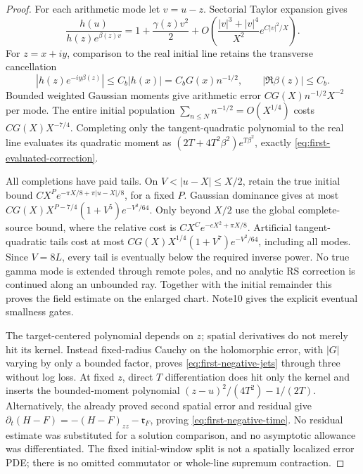 \documentclass[11pt]{article}
\numberwithin{equation}{section}
\begin{document}
\begin{proof}
For each arithmetic mode let \(v=u-z\). Sectorial Taylor expansion gives
\begin{equation}
 \frac{h(u)}{h(z)e^{\beta(z)v}}
 =1+\frac{\gamma(z)v^2}{2}
 +O\!\left(\frac{|v|^3+|v|^4}{X^2}e^{C|v|^2/X}\right).
 \label{eq:first-local-remainder}
\end{equation}
For \(z=x+iy\), comparison to the real initial line retains the
transverse cancellation
\[
 |h(z)e^{-iy\beta(z)}|\le C_b|h(x)|=C_bG(x)n^{-1/2},
 \qquad |\Re\beta(z)|\le C_b.
\]
Bounded weighted Gaussian moments give arithmetic error
\(CG(X)n^{-1/2}X^{-2}\) per mode. The entire initial population
\(\sum_{n\le N}n^{-1/2}=O(X^{1/4})\) costs
\(CG(X)X^{-7/4}\). Completing only the tangent-quadratic polynomial
to the real line evaluates its quadratic moment as
\((2T+4T^2\beta^2)e^{T\beta^2}\), exactly
\eqref{eq:first-evaluated-correction}.

All completions have paid tails. On
\(V<|u-X|\le X/2\), retain the true initial bound
\(CX^P e^{-\pi X/8+\pi|u-X|/8}\), for a fixed \(P\).
Gaussian dominance gives at most
\(CG(X)X^{P-7/4}(1+V^5)e^{-V^2/64}\).
Only beyond \(X/2\) use the global complete-source bound, where the
relative cost is \(CX^C e^{-cX^2+\pi X/8}\).
Artificial tangent-quadratic tails cost at most
\(CG(X)X^{1/4}(1+V^7)e^{-V^2/64}\), including all modes.
Since \(V=8L\), every tail is eventually below the required inverse
power. No true gamma mode is extended through remote poles, and no
analytic RS correction is continued along an unbounded ray.
Together with the initial remainder this proves the field estimate on
the enlarged chart. Note10 gives the explicit eventual smallness gates.

The target-centered polynomial depends on \(z\); spatial derivatives
do not merely hit its kernel. Instead fixed-radius Cauchy on the
holomorphic error, with \(|G|\) varying by only a bounded factor,
proves \eqref{eq:first-negative-jets} through three without log loss.
At fixed \(z\), direct \(T\) differentiation does hit only the
kernel and inserts the bounded-moment polynomial
\((z-u)^2/(4T^2)-1/(2T)\). Alternatively, the already proved
second spatial error and residual give
\(\partial_t(H-F)=-(H-F)_{zz}-\mathfrak r_F\), proving
\eqref{eq:first-negative-time}. No residual estimate was substituted
for a solution comparison, and no asymptotic allowance was differentiated.
The fixed initial-window split is not a spatially localized error PDE;
there is no omitted commutator or whole-line supremum contraction.
\end{proof}
\end{document}
